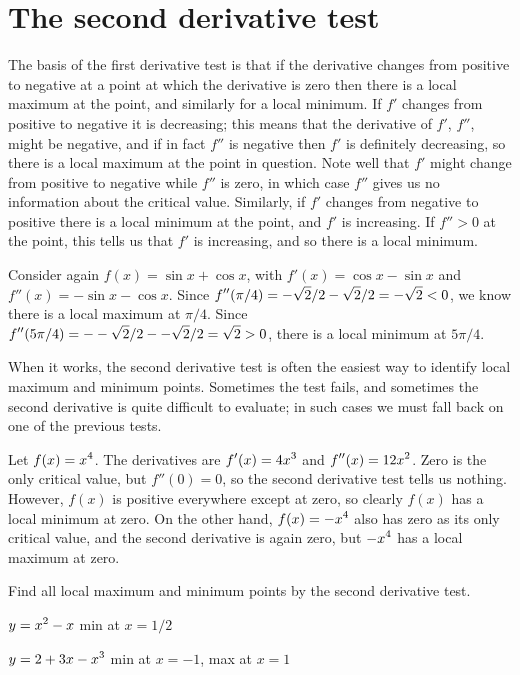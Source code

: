 \section{The second derivative test} {}{}
\nobreak
The basis of the first derivative test is that if the derivative
changes from positive to negative at a point at which the derivative
is zero then there is a local maximum at the point, and similarly for
a local minimum. If $f'$ changes from positive to negative it is
decreasing; this means that the derivative of $f'$, $f''$, might be negative,
and if in fact $f''$ is negative then $f'$ is definitely
decreasing, so there is a local maximum at the point in question. Note
well that $f'$ might change from positive to negative while $f''$ is
zero, in which case $f''$ gives us no information about the critical
value. Similarly, if $f'$ changes from negative to positive there is a
local minimum at the point, and $f'$ is increasing. If $f''>0$ at the
point, this tells us that $f'$ is increasing, and so there is a local
minimum. 

\example
Consider again $f(x)=\sin x + \cos x$, with $f'(x)=\cos x-\sin x$ and
$ f''(x)=-\sin x -\cos x$. Since $\displaystyle f''(\pi/4)=-\sqrt{2}/2-\sqrt2/2=-\sqrt2<0$,
we know there is a local maximum at $\pi/4$. Since
$\displaystyle f''(5\pi/4)=--\sqrt{2}/2--\sqrt2/2=\sqrt2>0$, there is a local
minimum at $5\pi/4$.
\endexample

When it works, the second derivative test is often the easiest way to
identify local maximum and minimum points. Sometimes the test fails,
and sometimes the second derivative is quite difficult to evaluate; in
such cases we must fall back on one of the previous tests.

\example
Let $\displaystyle f(x)=x^4$. The derivatives are $\displaystyle f'(x)=4x^3$ and
$\displaystyle f''(x)=12x^2$. Zero is the only critical value, but $f''(0)=0$, so
the second derivative test tells us nothing. However, $f(x)$ is
positive everywhere except at zero, so clearly $f(x)$ has a local
minimum at zero. On the other hand, $\displaystyle f(x)=-x^4$ also has zero as its
only critical value, and the second derivative is again zero, but
$\displaystyle -x^4$ has a local maximum at zero.
\endexample

\exercises
Find all local maximum and minimum points by the second derivative
test. 

\twocol
\exercise $\displaystyle y=x^2-x$ 
\answer min at $x=1/2$
\endanswer
\endexercise

\exercise $\displaystyle y=2+3x-x^3$ 
\answer min at $x=-1$, max at $x=1$
\endanswer
\endexercise

